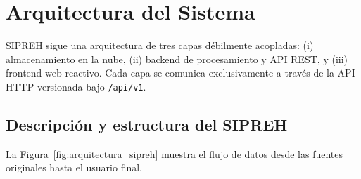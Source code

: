 \chapter{Arquitectura del Sistema}
\label{ch:arquitectura}

SIPREH sigue una arquitectura de tres capas débilmente acopladas: (i) almacenamiento en la nube, (ii) backend de procesamiento y API REST, y (iii) frontend web reactivo. Cada capa se comunica exclusivamente a través de la API HTTP versionada bajo \texttt{/api/v1}.

\section{Descripción y estructura del SIPREH}
\label{sec:arquitectura_detalle}

La Figura~\ref{fig:arquitectura_sipreh} muestra el flujo de datos desde las fuentes originales hasta el usuario final.

